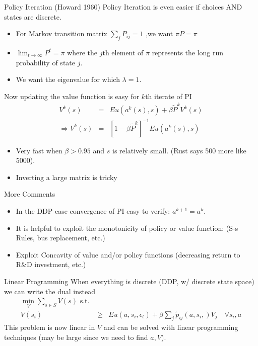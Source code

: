 \begin{frame}{Policy Iteration (Howard 1960)}
Policy Iteration is even easier if choices AND states are discrete.
\begin{itemize}
\item For Markov transition matrix $\sum_j P_{ij} =1$ ,we want $\pi P = \pi$
\item $\lim_{t \rightarrow \infty} P^t = \pi$ where the $j$th element of $\pi$ represents the long run probability of state $j$.
\item We want the eigenvalue for which $\lambda = 1$.
\end{itemize}
Now updating the value function is easy for $k$th iterate of PI
\begin{eqnarray*}
V^k(s) &=& Eu(a^k(s),s) + \beta \tilde{P}^k V^k(s)\\
\Rightarrow V^k(s) &=& [1 - \beta \tilde{P}^k]^{-1} Eu(a^k(s),s)
\end{eqnarray*}
\vspace{-1cm}
\begin{itemize}
\item Very fast when $\beta > 0.95$ and $s$ is relatively small. (Rust says 500 more like 5000).
\item Inverting a large matrix is tricky
\end{itemize}
\end{frame}


\begin{frame}{More Comments }
\begin{itemize}
\item In the DDP case convergence of PI easy to verify: $a^{k+1} = a^k$.
\item It is helpful to exploit the monotonicity of policy or value function: (S-s Rules, bus replacement, etc.)
\item Exploit Concavity of value and/or policy functions (decreasing return to R\&D investment, etc.) 
\end{itemize}
\end{frame}


\begin{frame}{Linear Programming}
When everything is discrete (DDP, w/ discrete state space) we can write the dual instead
\begin{eqnarray*}
\min_{V} \sum_{s \in S} V(s) \mbox{ s.t. }&& \\
V(s_i) &\geq& Eu(a,s_i,\epsilon_t)  + \beta \sum_j \tilde{p}_{ij}(a,s_i,) V_j \quad \forall s_i, a
\end{eqnarray*}
This problem is now linear in $V$ and can be solved with linear programming techniques (may be large since we need to find $a,V$).
\end{frame}

